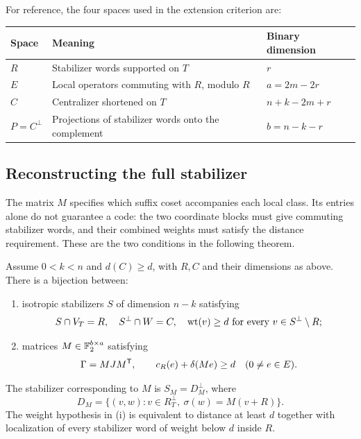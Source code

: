 For reference, the four spaces used in the extension criterion are:
\begin{center}\small
\begin{tabularx}{\linewidth}{@{}lXl@{}}\toprule
Space&Meaning&Binary dimension\\\midrule
\(R\)&Stabilizer words supported on \(T\)&\(r\)\\
\(E\)&Local operators commuting with \(R\), modulo \(R\)&\(a=2m-2r\)\\
\(C\)&Centralizer shortened on \(T\)&\(n+k-2m+r\)\\
\(P=C^\perp\)&Projections of stabilizer words onto the complement&\(b=n-k-r\)\\\bottomrule
\end{tabularx}
\end{center}

\subsection{Reconstructing the full stabilizer}

The matrix \(M\) specifies which suffix coset accompanies each local
class. Its entries alone do not guarantee a code: the two coordinate
blocks must give commuting stabilizer words, and their combined weights
must satisfy the distance requirement. These are the two conditions in
the following theorem.

\begin{theorem}\label{thm:extension}
Assume \(0<k<n\) and \(d(C)\geq d\), with \(R,C\) and their dimensions
as above.
There is a bijection between:
\begin{enumerate}[label=(\roman*)]
\item isotropic stabilizers \(S\) of dimension \(n-k\) satisfying
\[
 S\cap V_T=R,\quad S^\perp\cap W=C,\quad
 \operatorname{wt}(v)\geq d\ \text{for every }v\in S^\perp\setminus R;
\]
\item matrices \(M\in\mathbb F_2^{b\times a}\) satisfying
\begin{equation}\label{eq:exact}
 \Gamma=MJM^\mathsf T,\qquad
 c_R(e)+\delta(Me)\geq d\quad(0\ne e\in E).
\end{equation}
\end{enumerate}
The stabilizer corresponding to \(M\) is \(S_M=D_M^\perp\), where
\begin{equation}\label{eq:graph-D}
 D_M=\{(v,w):v\in R_T^\perp,\ \sigma(w)=M(v+R)\}.
\end{equation}
The weight hypothesis in (i) is equivalent to distance at least \(d\)
together with localization of every stabilizer word of weight below \(d\)
inside \(R\).
\end{theorem}

